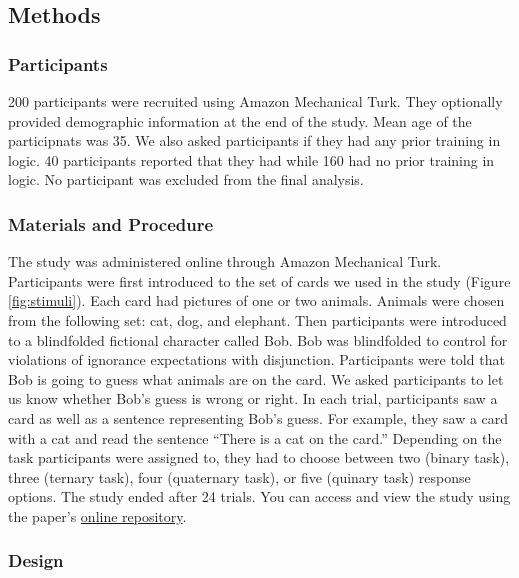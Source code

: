 \documentclass[floatsintext,man]{apa6}
\theoremstyle{definition}
\theoremstyle{definition}
\theoremstyle{definition}
\theoremstyle{remark}
\begin{document}
\subsection{Methods}\label{methods}

\subsubsection{Participants}\label{participants}

200 participants were recruited using Amazon Mechanical Turk. They
optionally provided demographic information at the end of the study.
Mean age of the participnats was 35. We also asked participants if they
had any prior training in logic. 40 participants reported that they had
while 160 had no prior training in logic. No participant was excluded
from the final analysis.

\subsubsection{Materials and Procedure}\label{materials-and-procedure}

The study was administered online through Amazon Mechanical Turk.
Participants were first introduced to the set of cards we used in the
study (Figure \ref{fig:stimuli}). Each card had pictures of one or two
animals. Animals were chosen from the following set: cat, dog, and
elephant. Then participants were introduced to a blindfolded fictional
character called Bob. Bob was blindfolded to control for violations of
ignorance expectations with disjunction. Participants were told that Bob
is going to guess what animals are on the card. We asked participants to
let us know whether Bob's guess is wrong or right. In each trial,
participants saw a card as well as a sentence representing Bob's guess.
For example, they saw a card with a cat and read the sentence
\enquote{There is a cat on the card.} Depending on the task participants
were assigned to, they had to choose between two (binary task), three
(ternary task), four (quaternary task), or five (quinary task) response
options. The study ended after 24 trials. You can access and view the
study using the paper's
\href{https://github.com/thegricean/si-paradigms/}{online repository}.

\subsubsection{Design}\label{design}
\end{document}
